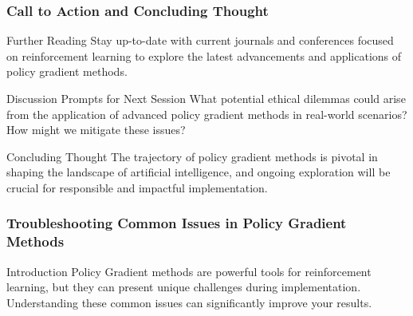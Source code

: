 \documentclass[aspectratio=169]{beamer}
\begin{document}
\begin{frame}[fragile]
    \frametitle{Call to Action and Concluding Thought}
    
    \begin{block}{Further Reading}
        Stay up-to-date with current journals and conferences focused on reinforcement learning to explore the latest advancements and applications of policy gradient methods.
    \end{block}

    \begin{block}{Discussion Prompts for Next Session}
        What potential ethical dilemmas could arise from the application of advanced policy gradient methods in real-world scenarios? How might we mitigate these issues?
    \end{block}

    \begin{block}{Concluding Thought}
        The trajectory of policy gradient methods is pivotal in shaping the landscape of artificial intelligence, and ongoing exploration will be crucial for responsible and impactful implementation.
    \end{block}
\end{frame}

\begin{frame}[fragile]
    \frametitle{Troubleshooting Common Issues in Policy Gradient Methods}
    \begin{block}{Introduction}
        Policy Gradient methods are powerful tools for reinforcement learning, but they can present unique challenges during implementation. Understanding these common issues can significantly improve your results.
    \end{block}
\end{frame}
\end{document}
